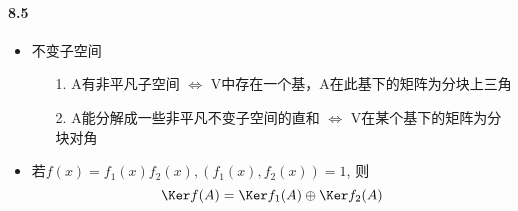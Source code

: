 \paragraph{8.5}
\begin{itemize}
    \item 不变子空间
    \begin{itemize}
        \item[1.] A有非平凡子空间 $\Longleftrightarrow$ V中存在一个基，A在此基下的矩阵为分块上三角
        \item[2.] A能分解成一些非平凡不变子空间的直和 $\Longleftrightarrow$ V在某个基下的矩阵为分块对角
    \end{itemize}
    \item 若$f(x)=f_1(x)f_2(x), (f_1(x),f_2(x))=1$, 则
    $$\Ker f(A) = \Ker f_1(A) \oplus \Ker f_2(A)$$
\end{itemize}

